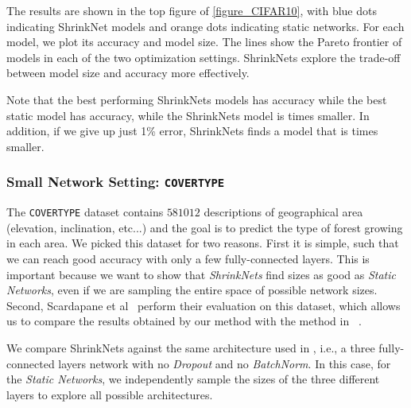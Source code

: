 The results are shown in the top figure of \cref{figure_CIFAR10}, with blue dots
indicating ShrinkNet models and orange dots indicating static networks. For each
model, we plot its accuracy and model size. The lines show the Pareto frontier
of models in each of the two optimization settings. ShrinkNets explore the
trade-off between model size and accuracy more effectively.   

Note that the best performing ShrinkNets models has  accuracy while the
best static model has  accuracy, while the ShrinkNets model is 
times smaller. In addition, if we give up just 1\% error, ShrinkNets finds a
model that is  times smaller. 

\subsubsection{Small Network Setting: \texttt{COVERTYPE}}

The \texttt{COVERTYPE} \cite{Blackard:1998:CNN:928509} dataset contains $581012$
descriptions of geographical area (elevation, inclination, etc...) and the goal
is to predict the type of forest growing in each area. We picked this dataset
for two reasons. First it is simple, such that we can reach good accuracy with
only a few fully-connected layers. This is important because we want to show
that \textit{ShrinkNets} find sizes as good as \textit{Static Networks}, even if
we are sampling the entire space of possible network sizes. Second, Scardapane
et al~\cite{Scardapane2017} perform their evaluation on this dataset, which
allows us to compare the results obtained by our method with the method in
~\cite{Scardapane2017}.

We compare ShrinkNets against the same architecture
used in \cite{Scardapane2017}, i.e., a three fully-connected layers network with no
\textit{Dropout} \cite{Srivastava2014} and no \textit{BatchNorm}. 
In this case, for the \textit{Static Networks}, we independently sample the
sizes of the three different layers to explore all possible architectures.

